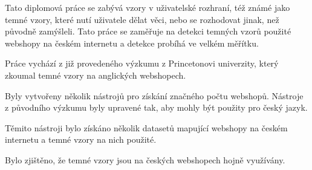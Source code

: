 Tato diplomová práce se zabývá vzory v uživatelské rozhraní, též známé jako temné vzory, které nutí uživatele dělat věci, nebo se rozhodovat jinak, než původně zamýšleli. Tato práce se zaměřuje na detekci temných vzorů použité webshopy na českém internetu a detekce probíhá ve velkém měřítku.

Práce vychází z již provedeného výzkumu z Princetonovi univerzity, který zkoumal temné vzory na anglických webshopech.

Byly vytvořeny několik nástrojů pro získání značného počtu webshopů. Nástroje z původního výzkumu byly upravené tak, aby mohly být použity pro český jazyk.

Těmito nástroji bylo získáno několik datasetů mapující webshopy na českém internetu a temné vzory na nich použité.

Bylo zjištěno, že temné vzory jsou na českých webshopech hojně využívány.